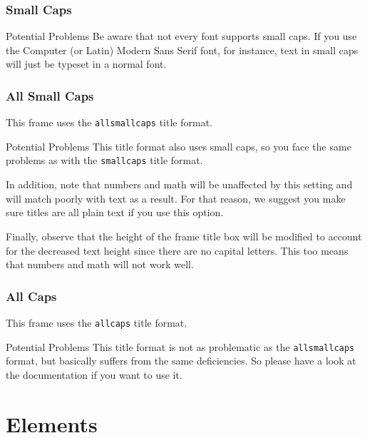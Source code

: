 \documentclass[10pt]{beamer}
\begin{document}
{
\begin{frame}
\frametitle{Small Caps}

  \begin{alertblock}{Potential Problems}
    Be aware that not every font supports small caps. If you use the Computer (or Latin) Modern Sans Serif font, for instance, text in small caps will just be typeset in a normal font.
  \end{alertblock}
\end{frame}
}

{
\begin{frame}
\frametitle{All Small Caps}
  This frame uses the \texttt{allsmallcaps} title format.

  \begin{alertblock}{Potential Problems}
    This title format also uses small caps, so you face the same problems as with the \texttt{smallcaps} title format.

    \medskip

    In addition, note that numbers and math will be unaffected by this setting and will match
    poorly with text as a result. For that reason, we suggest you make sure titles are all
    plain text if you use this option.

    \medskip

    Finally, observe that the height of the frame title box will be modified to account for the
    decreased text height since there are no capital letters. This too means that numbers and
    math will not work well.
  \end{alertblock}
\end{frame}
}

{
\begin{frame}
\frametitle{All Caps}
  This frame uses the \texttt{allcaps} title format.

  \begin{alertblock}{Potential Problems}
    This title format is not as problematic as the \texttt{allsmallcaps} format, but basically suffers from the same deficiencies. So please have a look at the documentation if you want to use it.
  \end{alertblock}
\end{frame}
}

\section{Elements}
\end{document}
